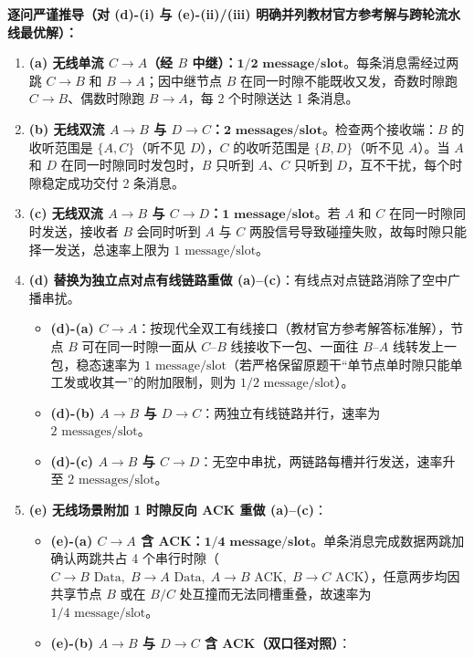 \textbf{逐问严谨推导（对 (d)-(i) 与 (e)-(ii)/(iii) 明确并列教材官方参考解与跨轮流水线最优解）：}
\begin{enumerate}
\item \textbf{(a) 无线单流 $C \to A$（经 $B$ 中继）：$\mathbf{1/2\text{ message/slot}}$}。每条消息需经过两跳 $C\to B$ 和 $B\to A$；因中继节点 $B$ 在同一时隙不能既收又发，奇数时隙跑 $C\to B$、偶数时隙跑 $B\to A$，每 2 个时隙送达 1 条消息。
\item \textbf{(b) 无线双流 $A \to B$ 与 $D \to C$：$\mathbf{2\text{ messages/slot}}$}。检查两个接收端：$B$ 的收听范围是 $\{A, C\}$（听不见 $D$），$C$ 的收听范围是 $\{B, D\}$（听不见 $A$）。当 $A$ 和 $D$ 在同一时隙同时发包时，$B$ 只听到 $A$、$C$ 只听到 $D$，互不干扰，每个时隙稳定成功交付 2 条消息。
\item \textbf{(c) 无线双流 $A \to B$ 与 $C \to D$：$\mathbf{1\text{ message/slot}}$}。若 $A$ 和 $C$ 在同一时隙同时发送，接收者 $B$ 会同时听到 $A$ 与 $C$ 两股信号导致碰撞失败，故每时隙只能择一发送，总速率上限为 $1\text{ message/slot}$。
\item \textbf{(d) 替换为独立点对点有线链路重做 (a)–(c)}：有线点对点链路消除了空中广播串扰。
  \begin{itemize}
  \item \textbf{(d)-(a) $C \to A$}：按现代全双工有线接口（教材官方参考解答标准解），节点 $B$ 可在同一时隙一面从 $C\text{–}B$ 线接收下一包、一面往 $B\text{–}A$ 线转发上一包，稳态速率为 \textbf{$1\text{ message/slot}$}（若严格保留原题干“单节点单时隙只能单工发或收其一”的附加限制，则为 $1/2\text{ message/slot}$）。
  \item \textbf{(d)-(b) $A\to B$ 与 $D\to C$}：两独立有线链路并行，速率为 \textbf{$2\text{ messages/slot}$}。
  \item \textbf{(d)-(c) $A\to B$ 与 $C\to D$}：无空中串扰，两链路每槽并行发送，速率升至 \textbf{$2\text{ messages/slot}$}。
  \end{itemize}
\item \textbf{(e) 无线场景附加 1 时隙反向 ACK 重做 (a)–(c)}：
  \begin{itemize}
  \item \textbf{(e)-(a) $C \to A$ 含 ACK：$\mathbf{1/4\text{ message/slot}}$}。单条消息完成数据两跳加确认两跳共占 4 个串行时隙（$C\to B \text{ Data},\; B\to A \text{ Data},\; A\to B \text{ ACK},\; B\to C \text{ ACK}$），任意两步均因共享节点 $B$ 或在 $B/C$ 处互撞而无法同槽重叠，故速率为 $1/4\text{ message/slot}$。
  \item \textbf{(e)-(b) $A \to B$ 与 $D \to C$ 含 ACK（双口径对照）}：
    \begin{itemize}

\end{itemize}
\end{itemize}
\end{enumerate}
